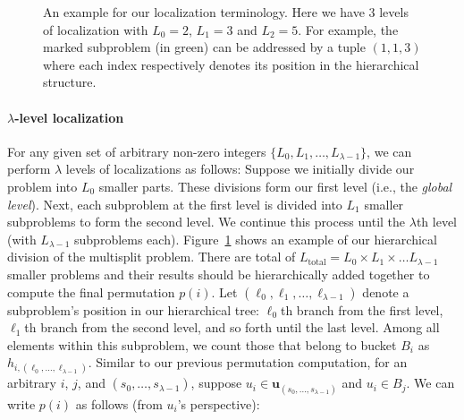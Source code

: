 \begin{figure}
  \centering
  
  \caption{An example for our localization terminology. Here we have 3 levels of localization with $L_0 = 2$, $L_1 = 3$ and $L_2 = 5$. For example, the marked subproblem (in green) can be addressed by a tuple $(1,1,3)$ where each index respectively denotes its position in the hierarchical structure.\label{fig:localization}}
\end{figure}

\paragraph{$\lambda$-level localization}
For any given set of arbitrary non-zero integers $\{L_0, L_1, \dots, L_{\lambda - 1}\}$, we can perform $\lambda$ levels of localizations as follows: Suppose we initially divide our problem into $L_0$ smaller parts. These divisions form our first level (i.e., the \emph{global level}).
Next, each subproblem at the first level is divided into $L_1$ smaller subproblems to form the second level. We continue this process until the $\lambda$th level (with $L_{\lambda-1}$ subproblems each). Figure~\ref{fig:localization} shows an example of our hierarchical division of the multisplit problem.
There are total of $L_\text{total} = L_0 \times L_1 \times \dots L_{\lambda - 1}$ smaller problems and their results should be hierarchically added together to compute the final permutation $p(i)$.
Let $(\ell_0,\ell_1,\dots,\ell_{\lambda-1})$ denote a subproblem's position in our hierarchical tree: $\ell_0$th branch from the first level, $\ell_1$th branch from the second level, and so forth until the last level.
Among all elements within this subproblem, we count those that belong to bucket $B_i$ as $h_{i,(\ell_0,\dots,\ell_{\lambda-1})}$.
Similar to our previous permutation computation, for an arbitrary $i$, $j$, and $(s_0,\dots,s_{\lambda-1})$, suppose $u_i \in \mathbf{u}_{(s_0, \dots, s_{\lambda-1})}$ and $u_i \in B_j$.
We can write $p(i)$ as follows (from $u_i$'s perspective):


